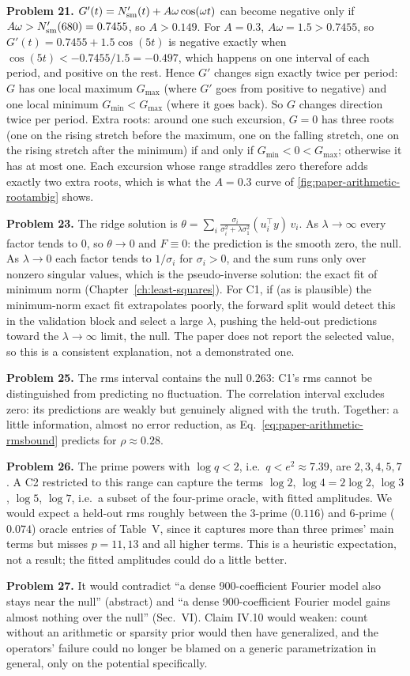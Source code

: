 \textbf{Problem 21.} $G'(t)=N_{\mathrm{sm}}'(t)+A\omega\cos(\omega t)$ can become negative only if $A\omega>N_{\mathrm{sm}}'(680)=0.7455$, so $A>0.149$. For $A=0.3$, $A\omega=1.5>0.7455$, so $G'(t)=0.7455+1.5\cos(5t)$ is negative exactly when $\cos(5t)<-0.7455/1.5=-0.497$, which happens on one interval of each period, and positive on the rest. Hence $G'$ changes sign exactly twice per period: $G$ has one local maximum $G_{\max}$ (where $G'$ goes from positive to negative) and one local minimum $G_{\min}<G_{\max}$ (where it goes back). So $G$ changes direction twice per period. Extra roots: around one such excursion, $G=0$ has three roots (one on the rising stretch before the maximum, one on the falling stretch, one on the rising stretch after the minimum) if and only if $G_{\min}<0<G_{\max}$; otherwise it has at most one. Each excursion whose range straddles zero therefore adds exactly two extra roots, which is what the $A=0.3$ curve of \cref{fig:paper-arithmetic-rootambig} shows.

\textbf{Problem 23.} The ridge solution is $\theta=\sum_i \frac{\sigma_i}{\sigma_i^2+\lambda\sigma_1^2}(u_i^\top y)\,v_i$. As $\lambda\to\infty$ every factor tends to $0$, so $\theta\to0$ and $F\equiv0$: the prediction is the smooth zero, the null. As $\lambda\to0$ each factor tends to $1/\sigma_i$ for $\sigma_i>0$, and the sum runs only over nonzero singular values, which is the pseudo-inverse solution: the exact fit of minimum norm (Chapter~\ref{ch:least-squares}). For C1, if (as is plausible) the minimum-norm exact fit extrapolates poorly, the forward split would detect this in the validation block and select a large $\lambda$, pushing the held-out predictions toward the $\lambda\to\infty$ limit, the null. The paper does not report the selected value, so this is a consistent explanation, not a demonstrated one.

\textbf{Problem 25.} The rms interval contains the null $0.263$: C1's rms cannot be distinguished from predicting no fluctuation. The correlation interval excludes zero: its predictions are weakly but genuinely aligned with the truth. Together: a little information, almost no error reduction, as Eq.~\eqref{eq:paper-arithmetic-rmsbound} predicts for $\rho\approx0.28$.

\textbf{Problem 26.} The prime powers with $\log q<2$, i.e.\ $q<e^2\approx7.39$, are $2,3,4,5,7$. A C2 restricted to this range can capture the terms $\log2$, $\log4=2\log2$, $\log3$, $\log5$, $\log7$, i.e.\ a subset of the four-prime oracle, with fitted amplitudes. We would expect a held-out rms roughly between the 3-prime ($0.116$) and 6-prime ($0.074$) oracle entries of Table~V, since it captures more than three primes' main terms but misses $p=11,13$ and all higher terms. This is a heuristic expectation, not a result; the fitted amplitudes could do a little better.

\textbf{Problem 27.} It would contradict ``a dense 900-coefficient Fourier model also stays near the null'' (abstract) and ``a dense 900-coefficient Fourier model gains almost nothing over the null'' (Sec.~VI). Claim IV.10 would weaken: count without an arithmetic or sparsity prior would then have generalized, and the operators' failure could no longer be blamed on a generic parametrization in general, only on the potential specifically.
